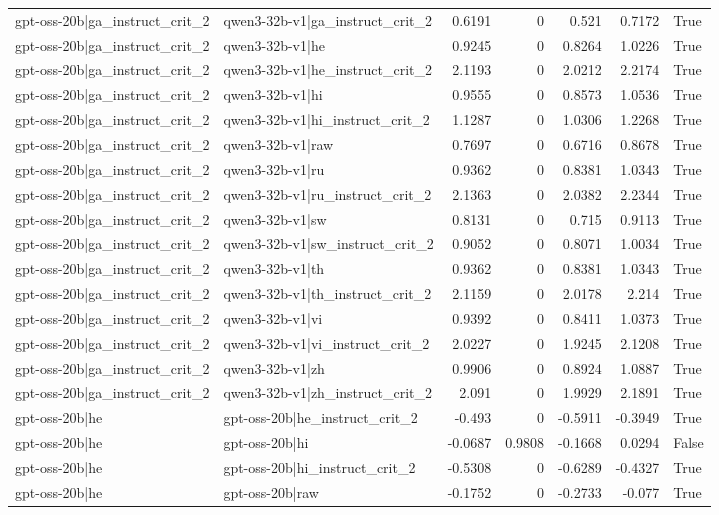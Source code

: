 \begin{table}
\begin{tabular}{l l r r r r l}
gpt-oss-20b|ga_instruct_crit_2 & qwen3-32b-v1|ga_instruct_crit_2 & 0.6191 & 0 & 0.521 & 0.7172 & True \\
gpt-oss-20b|ga_instruct_crit_2 & qwen3-32b-v1|he & 0.9245 & 0 & 0.8264 & 1.0226 & True \\
gpt-oss-20b|ga_instruct_crit_2 & qwen3-32b-v1|he_instruct_crit_2 & 2.1193 & 0 & 2.0212 & 2.2174 & True \\
gpt-oss-20b|ga_instruct_crit_2 & qwen3-32b-v1|hi & 0.9555 & 0 & 0.8573 & 1.0536 & True \\
gpt-oss-20b|ga_instruct_crit_2 & qwen3-32b-v1|hi_instruct_crit_2 & 1.1287 & 0 & 1.0306 & 1.2268 & True \\
gpt-oss-20b|ga_instruct_crit_2 & qwen3-32b-v1|raw & 0.7697 & 0 & 0.6716 & 0.8678 & True \\
gpt-oss-20b|ga_instruct_crit_2 & qwen3-32b-v1|ru & 0.9362 & 0 & 0.8381 & 1.0343 & True \\
gpt-oss-20b|ga_instruct_crit_2 & qwen3-32b-v1|ru_instruct_crit_2 & 2.1363 & 0 & 2.0382 & 2.2344 & True \\
gpt-oss-20b|ga_instruct_crit_2 & qwen3-32b-v1|sw & 0.8131 & 0 & 0.715 & 0.9113 & True \\
gpt-oss-20b|ga_instruct_crit_2 & qwen3-32b-v1|sw_instruct_crit_2 & 0.9052 & 0 & 0.8071 & 1.0034 & True \\
gpt-oss-20b|ga_instruct_crit_2 & qwen3-32b-v1|th & 0.9362 & 0 & 0.8381 & 1.0343 & True \\
gpt-oss-20b|ga_instruct_crit_2 & qwen3-32b-v1|th_instruct_crit_2 & 2.1159 & 0 & 2.0178 & 2.214 & True \\
gpt-oss-20b|ga_instruct_crit_2 & qwen3-32b-v1|vi & 0.9392 & 0 & 0.8411 & 1.0373 & True \\
gpt-oss-20b|ga_instruct_crit_2 & qwen3-32b-v1|vi_instruct_crit_2 & 2.0227 & 0 & 1.9245 & 2.1208 & True \\
gpt-oss-20b|ga_instruct_crit_2 & qwen3-32b-v1|zh & 0.9906 & 0 & 0.8924 & 1.0887 & True \\
gpt-oss-20b|ga_instruct_crit_2 & qwen3-32b-v1|zh_instruct_crit_2 & 2.091 & 0 & 1.9929 & 2.1891 & True \\
gpt-oss-20b|he & gpt-oss-20b|he_instruct_crit_2 & -0.493 & 0 & -0.5911 & -0.3949 & True \\
gpt-oss-20b|he & gpt-oss-20b|hi & -0.0687 & 0.9808 & -0.1668 & 0.0294 & False \\
gpt-oss-20b|he & gpt-oss-20b|hi_instruct_crit_2 & -0.5308 & 0 & -0.6289 & -0.4327 & True \\
gpt-oss-20b|he & gpt-oss-20b|raw & -0.1752 & 0 & -0.2733 & -0.077 & True \\

\end{tabular}
\end{table}
